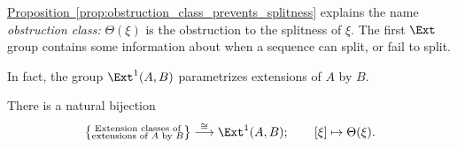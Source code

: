 \documentclass[main.tex]{subfiles}
\begin{document}
\hyperref[prop:obstruction_class_prevents_splitness]{Proposition~\ref*{prop:obstruction_class_prevents_splitness}} explains the name \emph{obstruction class:} $\Theta(\xi)$ is the obstruction to the splitness of $\xi$. The first $\Ext$ group contains some information about when a sequence can split, or fail to split.

In fact, the group $\Ext^{1}(A, B)$ parametrizes extensions of $A$ by $B$.

\begin{theorem}
  \label{thm:ext_parametrizes_extension_classes}
  There is a natural bijection
  \begin{equation*}
    \left\{ \substack{\text{Extension classes of} \\ \text{extensions of $A$ by $B$}} \right\} \overset{\cong}{\longrightarrow} \Ext^{1}(A, B);\qquad [\xi] \mapsto \Theta(\xi).
  \end{equation*}
\end{theorem}
\end{document}
